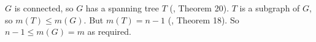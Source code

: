 $G$ is connected, so $G$ has a spanning tree $T$ (\cite{notes}, Theorem 20).
$T$ is a subgraph of $G$, so $m(T) \le m(G)$. But $m(T) = n-1$ 
(\cite{notes}, Theorem 18). So $n-1 \le m(G) = m$ as required.
